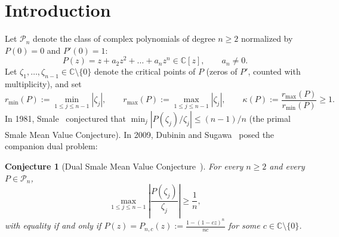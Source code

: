 \documentclass[11pt,a4paper]{article}
\newtheorem{conjecture}[theorem]{Conjecture}
\theoremstyle{definition}
\theoremstyle{remark}
\newcommand{\CC}{\mathbb{C}}
\begin{document}
\begin{abstract}
\begin{enumerate}
\item \textbf{Isolated Minimal Critical Point Theorem:} If a critical point $\zeta_j$ satisfies $|\zeta_k| \ge n|\zeta_j|$ for all $k \neq j$, then $|P(\zeta_j)/\zeta_j| > 5/18$ (an $n$-independent constant) and $|P(\zeta_j)/\zeta_j| \ge 1/n$ for all $n \ge 2$ (strictly for $n \ge 3$).
\item \textbf{Universal Strict Local Minimum Quadratic Form:} For all $n \ge 3$, the second variation of $|n P(1)|^2$ on the closed unit polydisk around $P_n$ is strictly positive definite with explicit eigenvalue $n/((n-1)^2(n-2))$.
\end{enumerate}
Finally, we analyze the perturbed-Chebyshev mechanism showing why single-component univalent disk methods face an inherent $O(1/n^2)$ barrier, and formulate a stronger sum conjecture $\sum_{j=1}^{n-1} |P(\zeta_j)/\zeta_j| \ge 1/e$ supported by numerical evidence up to $n = 25$.
\end{abstract}

\section{Introduction}

Let $\mathcal{P}_n$ denote the class of complex polynomials of degree $n \ge 2$ normalized by $P(0) = 0$ and $P'(0) = 1$:
\[
P(z) = z + a_2 z^2 + \dots + a_n z^n \in \CC[z], \qquad a_n \neq 0.
\]
Let $\zeta_1, \dots, \zeta_{n-1} \in \CC \setminus \{0\}$ denote the critical points of $P$ (zeros of $P'$, counted with multiplicity), and set
\[
r_{\min}(P) := \min_{1 \le j \le n-1} |\zeta_j|, \qquad r_{\max}(P) := \max_{1 \le j \le n-1} |\zeta_j|, \qquad \kappa(P) := \frac{r_{\max}(P)}{r_{\min}(P)} \ge 1.
\]
In 1981, Smale~\cite{Smale1981} conjectured that $\min_j |P(\zeta_j)/\zeta_j| \le (n-1)/n$ (the primal Smale Mean Value Conjecture). In 2009, Dubinin and Sugawa~\cite{DubininSugawa2009} posed the companion dual problem:

\begin{conjecture}[Dual Smale Mean Value Conjecture~\cite{DubininSugawa2009}]
\label{conj:dual-smale}
For every $n \ge 2$ and every $P \in \mathcal{P}_n$,
\[
\max_{1 \le j \le n-1} \left|\frac{P(\zeta_j)}{\zeta_j}\right| \ge \frac{1}{n},
\]
with equality if and only if $P(z) = P_{n,c}(z) := \frac{1 - (1 - cz)^n}{nc}$ for some $c \in \CC \setminus \{0\}$.
\end{conjecture}
\end{document}
